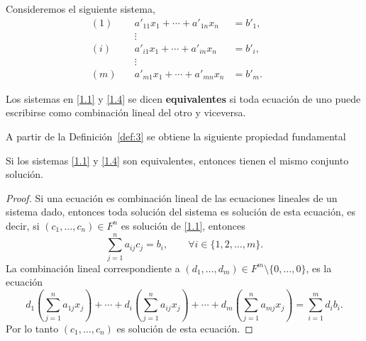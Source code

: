 \documentclass[12pt,a4paper]{book}
\newcommand{\llaves}[1]{\{#1\}}
\newcommand{\parentesis}[1]{\left(#1\right)}
\begin{document}
    Consideremos el siguiente sistema,
    \begin{equation}
        \begin{alignedat}{3}
            (1)\quad & a'_{11}x_{1} + \cdots + a'_{1n}x_{n} & =  b'_{1},\\
            &\vdots   &                                  &   &      \\
            (i)\quad & a'_{i1}x_{1} +  \cdots + a'_{in}x_{n} & =  b'_{i},\\
            &\vdots   &                                  &   &      \\
            (m)\quad & a'_{m1}x_{1} + \cdots + a'_{mn}x_{n} & =  b'_{m}.
        \end{alignedat}
        \tag{1.4}
        \label{1.4}
    \end{equation}

    \begin{definicion}
    \label{def:3}
        Los sistemas en \eqref{1.1} y \eqref{1.4} se dicen \textbf{equivalentes} si toda ecuación de uno puede escribirse como combinación lineal del otro y viceversa.
    \end{definicion}
    
    A partir de la Definición~\ref{def:3} se obtiene la siguiente propiedad fundamental
    
    \begin{proposicion}
    \label{prop:1}
        Si los sistemas \eqref{1.1} y \eqref{1.4} son equivalentes, entonces tienen el mismo conjunto solución.
    \end{proposicion}
    
    \begin{proof}
        Si una ecuación es combinación lineal de las ecuaciones lineales de un sistema dado, entonces toda solución del sistema es solución de esta ecuación, es decir, si $\parentesis{c_{1}, \dots , c_{n}} \in F^{n}$ es solución de \eqref{1.1}, entonces 
        \begin{equation*}
            \sum_{j = 1}^{n}a_{ij}c_{j} = b_{i}, \qquad \forall i \in \llaves{1, 2, \dots, m}.
        \end{equation*}
        La combinación lineal correspondiente a $(d_{1}, \dots , d_{m}) \in F^{m} \setminus \llaves{0, \dots , 0}$, es la ecuación
        \begin{equation*}
            d_{1} \parentesis{\sum_{j = 1}^{n}a_{1j}x_{j}} + \dotsi + d_{i} \parentesis{\sum_{j = 1}^{n}a_{ij}x_{j}} + \dotsi + d_{m} \parentesis{\sum_{j = 1}^{n}a_{mj}x_{j}} = \sum_{i = 1}^{m} d_{i}b_{i}.
        \end{equation*}
        Por lo tanto $\parentesis{c_{1}, \dots, c_{n}}$ es solución de esta ecuación.
    \end{proof}
    
\end{document}
